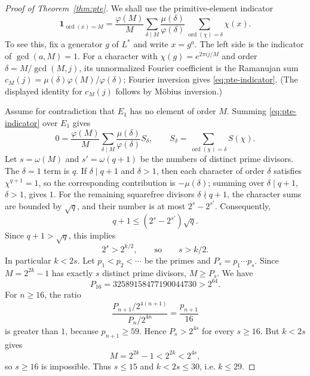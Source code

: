 \documentclass[11pt]{article}
\begin{document}
\begin{proof}[Proof of Theorem~\ref{thm:pte}]
We shall use the primitive-element indicator
\begin{equation}\label{eq:pte-indicator}
\mathbf 1_{\operatorname{ord}(x)=M}
=\frac{\varphi(M)}M
\sum_{\delta\mid M}\frac{\mu(\delta)}{\varphi(\delta)}
\sum_{\operatorname{ord}(\chi)=\delta}\chi(x).
\end{equation}
To see this, fix a generator $g$ of $L^*$ and write $x=g^a$. The left side
is the indicator of $\gcd(a,M)=1$. For a character with
$\chi(g)=e^{2\pi i j/M}$ and order $\delta=M/\gcd(M,j)$, its unnormalized
Fourier coefficient is the Ramanujan sum
$c_M(j)=\mu(\delta)\varphi(M)/\varphi(\delta)$; Fourier inversion gives
\eqref{eq:pte-indicator}. (The displayed identity for $c_M(j)$ follows by
M\"obius inversion.)

Assume for contradiction that $E_1$ has no element of order $M$. Summing
\eqref{eq:pte-indicator} over $E_1$ gives
\[
0=\frac{\varphi(M)}M
\sum_{\delta\mid M}\frac{\mu(\delta)}{\varphi(\delta)}S_\delta,
\qquad
S_\delta=\sum_{\operatorname{ord}(\chi)=\delta}S(\chi).
\]
Let $s=\omega(M)$ and $s'=\omega(q+1)$ be the numbers of distinct prime
divisors. The $\delta=1$ term is $q$. If $\delta\mid q+1$ and $\delta>1$,
then each character of order $\delta$ satisfies $\chi^{q+1}=1$, so the
corresponding contribution is $-\mu(\delta)$; summing over
$\delta\mid q+1$, $\delta>1$, gives $1$. For the remaining squarefree
divisors $\delta\nmid q+1$, the character sums are bounded by $\sqrt q$,
and their number is at most $2^s-2^{s'}$. Consequently,
\[
q+1\le(2^s-2^{s'})\sqrt q. \tag{B.1}\label{eq:pte-bound}
\]
Since $q+1>\sqrt q$, this implies
\[
2^s>2^{k/2}, \qquad\text{so}\qquad s>k/2.
\]
In particular $k<2s$. Let $p_1<p_2<\cdots$ be the primes and
$P_s=p_1\cdots p_s$. Since $M=2^{2k}-1$ has exactly $s$ distinct prime
divisors, $M\ge P_s$. We have
\[
P_{16}=32589158477190044730>2^{64}.
\]
For $n\ge16$, the ratio
\[
\frac{P_{n+1}/2^{4(n+1)}}{P_n/2^{4n}}
=\frac{p_{n+1}}{16}
\]
is greater than $1$, because $p_{n+1}\ge59$. Hence $P_s>2^{4s}$ for
every $s\ge16$. But $k<2s$ gives
\[
M=2^{2k}-1<2^{2k}<2^{4s},
\]
so $s\ge16$ is impossible. Thus $s\le15$ and $k<2s\le30$, i.e.
$k\le29$.


\end{proof}
\end{document}
